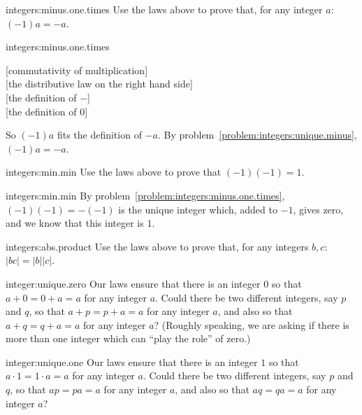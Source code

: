 \begin{problem}{integers:minus.one.times}
Use the laws above to prove that, for any integer \(a\): \((-1)a=-a\).
\end{problem}
\begin{answer}{integers:minus.one.times}
\begin{twocolumnproof}
[commutativity of multiplication] \\
[the distributive law on the right hand side] \\
[the definition of \(-\)] \\
[the definition of \(0\)] 
\end{twocolumnproof}
So \((-1)a\) fits the definition of \(-a\).
By problem~\vref{problem:integers:unique.minus}, \((-1)a=-a\).
\end{answer}


\begin{problem}{integers:min.min}
Use the laws above to prove that \((-1)(-1)=1\).
\end{problem}
\begin{answer}{integers:min.min}
By problem~\vref{problem:integers:minus.one.times}, \((-1)(-1)=-(-1)\) is the unique integer which, added to \(-1\), gives zero, and we know that this integer is \(1\).
\end{answer}


\begin{problem}{integers:abs.product}
Use the laws above to prove that, for any integers \(b,c\): \(|bc|=|b||c|\).
\end{problem}

\begin{problem}{integer:unique.zero}
Our laws ensure that there is an integer \(0\) so that \(a+0=0+a=a\) for any integer \(a\).
Could there be two different integers, say \(p\) and \(q\), so that \(a+p=p+a=a\) for any integer \(a\), and also so that \(a+q=q+a=a\) for any integer \(a\)?
(Roughly speaking, we are asking if there is more than one integer which can ``play the role'' of zero.)
\end{problem}

\begin{problem}{integer:unique.one}
Our laws ensure that there is an integer \(1\) so that \(a \cdot 1=1 \cdot a=a\) for any integer \(a\).
Could there be two different integers, say \(p\) and \(q\), so that \(ap=pa=a\) for any integer \(a\), and also so that \(aq=qa=a\) for any integer \(a\)?
\end{problem}


